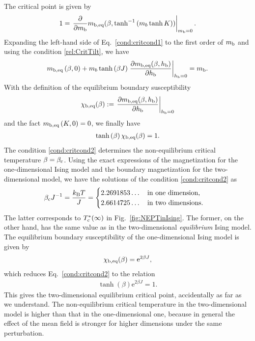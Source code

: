 The critical point is given by
\begin{align}
1=\left.\frac{\partial}{\partial m_{\rm b}}m_{\rm b,eq}(\beta, \tanh^{-1}\left(m_{b}\tanh K\right))\right|_{m_{\rm b}=0}.\label{rel:CritTilt}
\end{align}
Expanding the left-hand side of Eq.~\eqref{cond:critcond1} to the first order of $m_{\rm b}$ and using the condition \eqref{rel:CritTilt}, we have
\begin{align}
m_{\rm b,eq}\left(\beta,0\right) + m_{b}\tanh\left(\beta J\right)\left.\frac{\partial m_{\rm b,eq}(\beta,h_{\rm b})}{\partial h_{\rm b}}\right|_{h_{\rm b}=0} = m_{\rm b}.
\end{align}
With the definition of the equilibrium boundary susceptibility
\begin{align}
\chi_{\rm b, eq}(\beta):=\left.\frac{\partial m_{\rm b,eq}(\beta,h_{\rm b})}{\partial h_{\rm b}}\right|_{h_{\rm b}=0}
\end{align}
and the fact $m_{\rm b,eq}\left(K,0\right)=0$, we finally have
\begin{align}
\tanh \left(\beta\right)\chi_{\rm b, eq}(\beta) = 1.\label{cond:critcond2}
\end{align}
The condition \eqref{cond:critcond2} determines the non-equilibrium critical temperature $\beta=\beta_{\rm c}$. Using the exact expressions of the magnetization for the one-dimensional Ising model and the boundary magnetization for the two-dimensional model, we have the solutions of the condition \eqref{cond:critcond2} as
\begin{align}
{\beta_{\rm c}J}^{-1}=\frac{k_{\rm B}T}{J}=\begin{cases}
2.2691853\dots\quad\text{in one dimension,}\\
2.6614725\dots\quad\text{in two dimensions.}
\end{cases}
\end{align}
The latter corresponds to $T^{*}_{\rm c}(\infty)$ in Fig.~\ref{fig:NEPTinIsing}. The former, on the other hand, has the same value as in the two-dimensional \textit{equilibrium} Ising model. The equilibrium boundary susceptibility of the one-dimensional Ising model is given by
\begin{align}
\chi_{\rm b, eq}(\beta) = \mathrm{e}^{2\beta J},
\end{align}
which reduces Eq.~\eqref{cond:critcond2} to the relation
\begin{align}
\tanh \left(\beta\right)\mathrm{e}^{2\beta J} = 1.
\end{align}
This gives the two-dimensional equilibrium critical point, accidentally as far as we understand. The non-equilibrium critical temperature in the two-dimensional model is higher than that in the one-dimensional one, because in general the effect of the mean field is stronger for higher dimensions under the same perturbation.